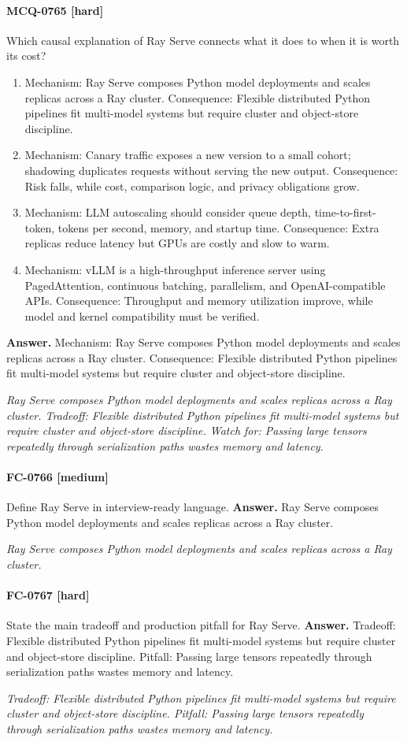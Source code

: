 \paragraph{MCQ-0765 [hard]} Which causal explanation of Ray Serve connects what it does to when it is worth its cost?
\begin{enumerate}[label=\Alph*.]
\item Mechanism: Ray Serve composes Python model deployments and scales replicas across a Ray cluster. Consequence: Flexible distributed Python pipelines fit multi-model systems but require cluster and object-store discipline.
\item Mechanism: Canary traffic exposes a new version to a small cohort; shadowing duplicates requests without serving the new output. Consequence: Risk falls, while cost, comparison logic, and privacy obligations grow.
\item Mechanism: LLM autoscaling should consider queue depth, time-to-first-token, tokens per second, memory, and startup time. Consequence: Extra replicas reduce latency but GPUs are costly and slow to warm.
\item Mechanism: vLLM is a high-throughput inference server using PagedAttention, continuous batching, parallelism, and OpenAI-compatible APIs. Consequence: Throughput and memory utilization improve, while model and kernel compatibility must be verified.
\end{enumerate}
\noindent\textbf{Answer.} Mechanism: Ray Serve composes Python model deployments and scales replicas across a Ray cluster. Consequence: Flexible distributed Python pipelines fit multi-model systems but require cluster and object-store discipline.
\par\textit{Ray Serve composes Python model deployments and scales replicas across a Ray cluster. Tradeoff: Flexible distributed Python pipelines fit multi-model systems but require cluster and object-store discipline. Watch for: Passing large tensors repeatedly through serialization paths wastes memory and latency.}
\paragraph{FC-0766 [medium]} Define Ray Serve in interview-ready language.
\noindent\textbf{Answer.} Ray Serve composes Python model deployments and scales replicas across a Ray cluster.
\par\textit{Ray Serve composes Python model deployments and scales replicas across a Ray cluster.}
\paragraph{FC-0767 [hard]} State the main tradeoff and production pitfall for Ray Serve.
\noindent\textbf{Answer.} Tradeoff: Flexible distributed Python pipelines fit multi-model systems but require cluster and object-store discipline. Pitfall: Passing large tensors repeatedly through serialization paths wastes memory and latency.
\par\textit{Tradeoff: Flexible distributed Python pipelines fit multi-model systems but require cluster and object-store discipline. Pitfall: Passing large tensors repeatedly through serialization paths wastes memory and latency.}
